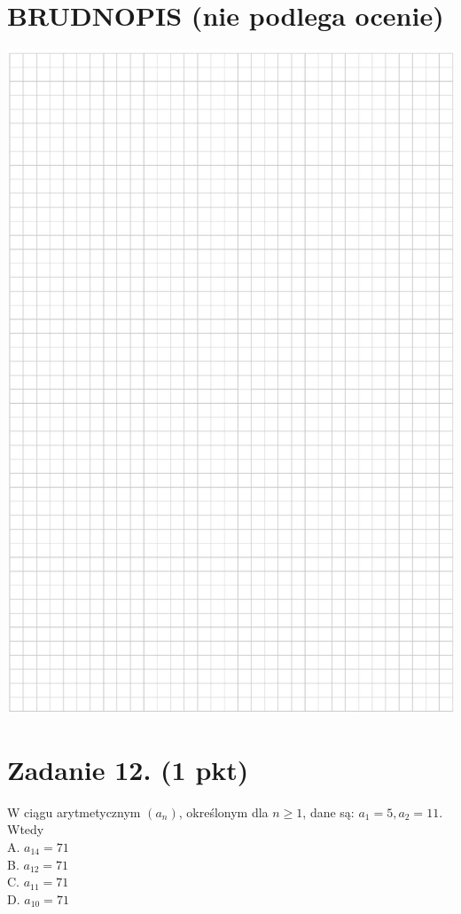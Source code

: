 \documentclass[10pt]{article}
\begin{document}
\section*{BRUDNOPIS (nie podlega ocenie)}
\begin{center}
\includegraphics[max width=\textwidth]{2024_11_21_ad8c43efe74fa059d24eg-07}
\end{center}

\section*{Zadanie 12. (1 pkt)}
W ciągu arytmetycznym \(\left(a_{n}\right)\), określonym dla \(n \geq 1\), dane są: \(a_{1}=5, a_{2}=11\). Wtedy\\
A. \(a_{14}=71\)\\
B. \(a_{12}=71\)\\
C. \(a_{11}=71\)\\
D. \(a_{10}=71\)
\end{document}
